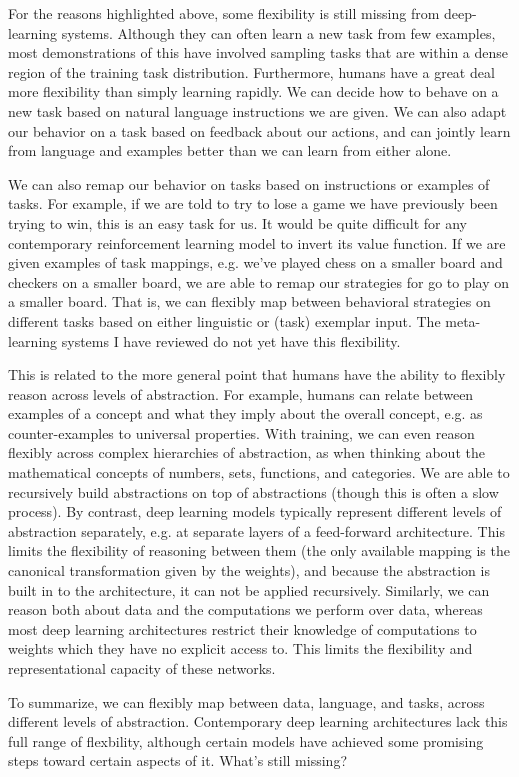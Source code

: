 For the reasons highlighted above, some flexibility is still missing from deep-learning systems. Although they can often learn a new task from few examples, most demonstrations of this have involved sampling tasks that are within a dense region of the training task distribution. Furthermore, humans have a great deal more flexibility than simply learning rapidly. We can decide how to behave on a new task based on natural language instructions we are given. We can also adapt our behavior on a task based on feedback about our actions, and can jointly learn from language and examples better than we can learn from either alone. \par
We can also remap our behavior on tasks based on instructions or examples of tasks. For example, if we are told to try to lose a game we have previously been trying to win, this is an easy task for us. It would be quite difficult for any contemporary reinforcement learning model to invert its value function. If we are given examples of task mappings, e.g. we've played chess on a smaller board and checkers on a smaller board, we are able to remap our strategies for go to play on a smaller board. That is, we can flexibly map between behavioral strategies on different tasks based on either linguistic or (task) exemplar input. The meta-learning systems I have reviewed do not yet have this flexibility. \par
This is related to the more general point that humans have the ability to flexibly reason across levels of abstraction. For example, humans can relate between examples of a concept and what they imply about the overall concept, e.g. as counter-examples to universal properties. With training, we can even reason flexibly across complex hierarchies of abstraction, as when thinking about the mathematical concepts of numbers, sets, functions, and categories. We are able to recursively build abstractions on top of abstractions (though this is often a slow process). By contrast, deep learning models typically represent different levels of abstraction separately, e.g. at separate layers of a feed-forward architecture. This limits the flexibility of reasoning between them (the only available mapping is the canonical transformation given by the weights), and because the abstraction is built in to the architecture, it can not be applied recursively. Similarly, we can reason both about data and the computations we perform over data, whereas most deep learning architectures restrict their knowledge of computations to weights which they have no explicit access to. This limits the flexibility and representational capacity of these networks. \par 
To summarize, we can flexibly map between data, language, and tasks, across different levels of abstraction. Contemporary deep learning architectures lack this full range of flexbility, although certain models have achieved some promising steps toward certain aspects of it. What's still missing? \par 

